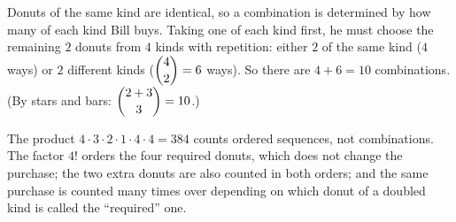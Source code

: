 Donuts of the same kind are identical, so a combination is determined by how many of each kind Bill buys. Taking one of each kind first, he must choose the remaining $2$ donuts from $4$ kinds with repetition: either $2$ of the same kind ($4$ ways) or $2$ different kinds ($\dbinom42=6$ ways). So there are $4+6=\boxed{10}$ combinations. (By stars and bars: $\dbinom{2+3}{3}=10$.)

The product $4\cdot3\cdot2\cdot1\cdot4\cdot4=384$ counts ordered sequences, not combinations. The factor $4!$ orders the four required donuts, which does not change the purchase; the two extra donuts are also counted in both orders; and the same purchase is counted many times over depending on which donut of a doubled kind is called the ``required'' one.
